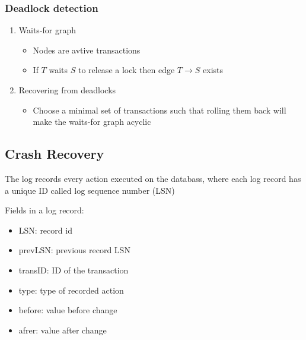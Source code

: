 \documentclass{article}
\begin{document}
\subsubsection*{Deadlock detection}
\begin{enumerate}
  \item Waits-for graph
        \begin{itemize}
          \item Nodes are avtive transactions
          \item If $T$ waits $S$ to release a lock then edge $T\rightarrow S$ exists
        \end{itemize}
  \item Recovering from deadlocks
        \begin{itemize}
          \item Choose a minimal set of transactions such that rolling them back will make the waits-for graph acyclic
        \end{itemize}
\end{enumerate}

\subsection{Crash Recovery}
The log records every action executed on the databass, where each log record has a unique ID called log sequence number (LSN)

Fields in a log record:
\begin{itemize}
  \item LSN: record id
  \item prevLSN: previous record LSN
  \item transID: ID of the transaction
  \item type: type of recorded action
  \item before: value before change
  \item afrer: value after change
\end{itemize}
\end{document}

